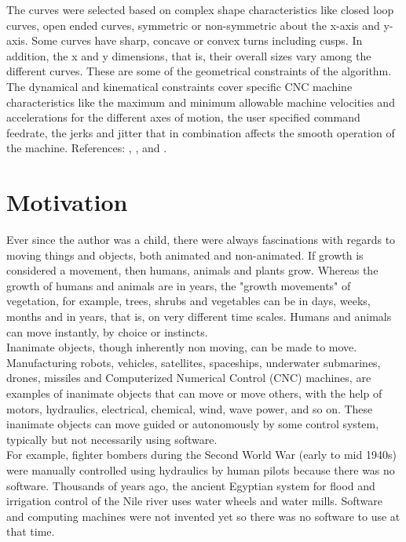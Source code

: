 The curves were selected based on complex shape characteristics like closed loop curves, open ended curves, symmetric or non-symmetric about the x-axis and y-axis. Some curves have sharp, concave or convex turns including cusps. In addition, the x and y dimensions, that is, their overall sizes vary among the different curves. These are some of the geometrical constraints of the algorithm.\\ 

The dynamical and kinematical constraints cover specific CNC machine characteristics like the maximum and minimum allowable machine velocities and accelerations for the different axes of motion, the user specified command feedrate, the jerks and jitter that in combination affects the smooth operation of the machine.  References: \cite{Yeh:2019}, \cite{Yu-etal:2020}, and \cite{Rob:2022}.


\section{Motivation}

Ever since the author was a child, there were always fascinations with regards to moving things and objects, both animated and non-animated. If growth is considered a movement, then humans, animals and plants grow. Whereas the growth of humans and animals are in years, the "growth movements" of vegetation, for example, trees, shrubs and vegetables can be in days, weeks, months and in years, that is, on very different time scales. Humans and animals can move instantly, by choice or instincts. \\

Inanimate objects, though inherently non moving, can be made to move. Manufacturing robots, vehicles, satellites, spaceships, underwater submarines, drones, missiles and Computerized Numerical Control (CNC) machines, are examples of inanimate objects that can move or move others, with the help of motors, hydraulics, electrical, chemical, wind, wave power, and so on. These inanimate objects can move guided or autonomously by some control system, typically but not necessarily using software.\\ 

For example, fighter bombers during the Second World War (early to mid 1940s) were manually controlled using hydraulics by human pilots because there was no software. Thousands of years ago, the ancient Egyptian system for flood and irrigation control of the Nile river uses water wheels and water mills. Software and computing machines were not invented yet so there was no software to use at that time.\\ 

